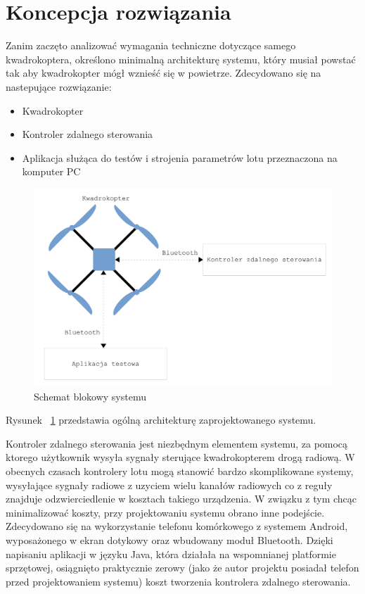 \section{Koncepcja rozwiązania}

Zanim zaczęto analizować wymagania techniczne dotyczące samego kwadrokoptera, określono minimalną architekturę systemu, który musiał powstać tak aby kwadrokopter mógł wznieść się w powietrze. Zdecydowano się na nastepujące rozwiązanie:

\begin{itemize}
	\item Kwadrokopter
	\item Kontroler zdalnego sterowania 
	\item Aplikacja służąca do testów i strojenia parametrów lotu przeznaczona na komputer PC
\end{itemize}

\begin{figure}[H]
	\centering
	\includegraphics[scale=0.1]{Pictures/SchematSystemu.png}
	\caption[Schemat blokowy systemu]{Schemat blokowy systemu}
	\label{fig:SchematSystemu}
\end{figure}



Rysunek ~\ref{fig:SchematSystemu} przedstawia ogólną architekturę zaprojektowanego systemu.

Kontroler zdalnego sterowania jest niezbędnym elementem systemu, za pomocą ktorego użytkownik wysyła sygnały sterujące kwadrokopterem drogą radiową. W obecnych czasach kontrolery lotu mogą stanowić bardzo skomplikowane systemy, wysyłające sygnały radiowe z uzyciem wielu kanałów radiowych co z reguły znajduje odzwierciedlenie w kosztach takiego urządzenia. W związku z tym chcąc minimalizować koszty, przy projektowaniu systemu obrano inne podejście. Zdecydowano się na wykorzystanie telefonu komórkowego z systemem Android, wyposażonego w ekran dotykowy oraz wbudowany moduł Bluetooth. Dzięki napisaniu aplikacji w języku Java, która działała na wspomnianej platformie sprzętowej, osiągnięto praktycznie zerowy (jako że autor projektu posiadał telefon przed projektowaniem systemu) koszt tworzenia kontrolera zdalnego sterowania. 


